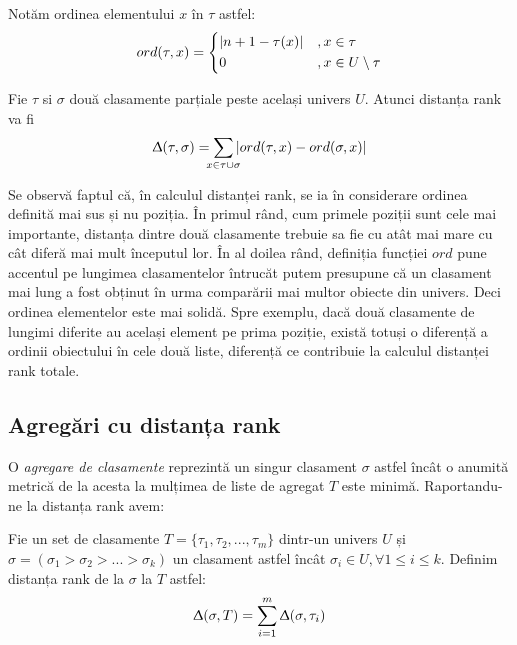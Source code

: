 Notăm ordinea elementului $x$ în $\tau$ astfel:
\begin{gather}
\label{ord}
  ord(\tau, x)= \begin{dcases}
    |n + 1 - \tau(x)|    &, x \in \tau \\
    0                    &, x \in U \setminus \tau
  \end{dcases}
\end{gather}

\begin{definition}
Fie $\tau$ si $\sigma$ două clasamente parțiale peste același univers $U$. Atunci distanța rank va fi
\begin{gather}
  \Updelta(\tau, \sigma) = \smashoperator{\sum_{x \in \tau \cup \sigma}} |ord(\tau, x) - ord(\sigma, x)|
\end{gather}
\end{definition}

Se observă faptul că, în calculul distanței rank, se ia în considerare ordinea definită mai sus
și nu poziția. În primul rând, cum primele poziții sunt cele mai importante, distanța dintre două
clasamente trebuie sa fie cu atât mai mare cu cât diferă mai mult începutul lor.\cite{linguisticstructuresmarcus}
În al doilea rând, definiția funcției $ord$ pune accentul pe lungimea clasamentelor întrucăt putem
presupune că un clasament mai lung a fost obținut în urma comparării mai multor obiecte din univers.
Deci ordinea elementelor este mai solidă. Spre exemplu, dacă două clasamente de lungimi diferite au
același element pe prima poziție, există totuși o diferență a ordinii obiectului în cele două liste,
diferență ce contribuie la calculul distanței rank totale.\cite{rankaggregationproblem}

\subsection{Agregări cu distanța rank}
O \textit{agregare de clasamente} reprezintă un singur clasament $\sigma$ astfel încât o anumită 
metrică de la acesta la mulțimea de liste de agregat $T$ este minimă. Raportandu-ne la distanța
rank avem\cite{rankdistance}:

\begin{definition}
Fie un set de clasamente $T = \{\tau_1, \tau_2, ..., \tau_m\}$ dintr-un univers $U$ și
$\sigma = (\sigma_1 > \sigma_2 > ... > \sigma_k)$ un clasament astfel încât $\sigma_i \in U, 
\forall 1 \leqslant i \leqslant k$. Definim distanța rank de la $\sigma$ la $T$ astfel:
\begin{gather}
  \Updelta(\sigma, T) = \smashoperator{\sum_{i = 1}^{m}} \Updelta(\sigma, \tau_i)
\end{gather}
\end{definition}

